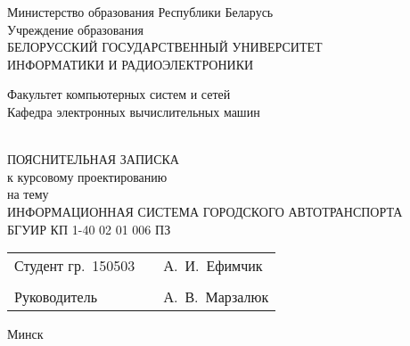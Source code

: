 \begin{titlepage}
    \begin{center}
      Министерство образования Республики Беларусь\\[1em]
      Учреждение образования\\
      БЕЛОРУССКИЙ ГОСУДАРСТВЕННЫЙ УНИВЕРСИТЕТ\\
      ИНФОРМАТИКИ И РАДИОЭЛЕКТРОНИКИ\\[2em]
  
      \begin{minipage}{\textwidth}
        \begin{flushleft}
          Факультет компьютерных систем и сетей\\[1em]
          Кафедра электронных вычислительных машин\\[1em]
        \end{flushleft}
      \end{minipage}\\[1em]
      
      \vfill
        ПОЯСНИТЕЛЬНАЯ ЗАПИСКА \\
к курсовому проектированию  \\
на тему \\
\MakeUppercase{информационная система городского автотранспорта} \\ 
БГУИР КП 1-40 02 01 006 ПЗ \\

      \vfill

      \begin{tabular}{p{}p{}p{}}
        Студент гр.~150503     &&   А.~И.~Ефимчик    \\
                               &&                    \\
        Руководитель           &&   А.~В.~Марзалюк   \\
      \end{tabular}
      
      \vfill

      {\normalsize Минск \the\year}
    \end{center}
\end{titlepage}